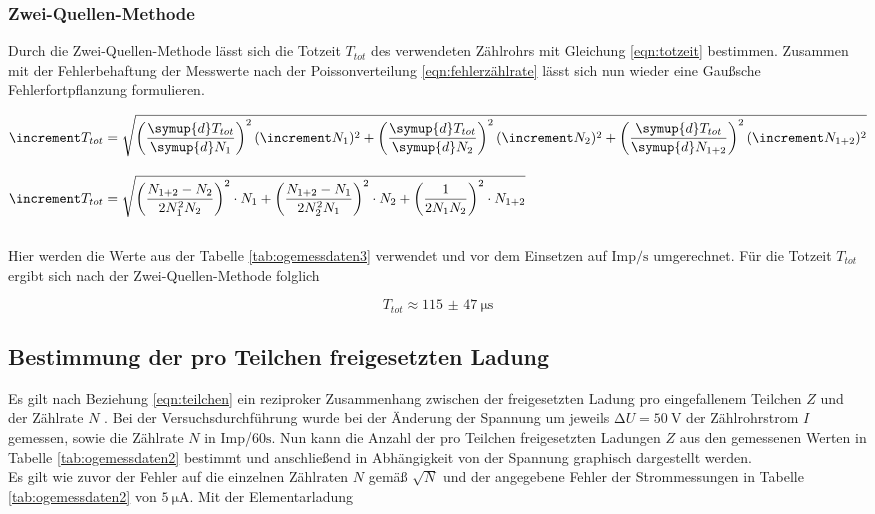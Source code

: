 \subsubsection{Zwei-Quellen-Methode}
Durch die Zwei-Quellen-Methode lässt sich die Totzeit $T_{tot}$ des verwendeten Zählrohrs mit Gleichung \eqref{eqn:totzeit} bestimmen.
Zusammen mit der Fehlerbehaftung der Messwerte nach der Poissonverteilung \eqref{eqn:fehlerzählrate} lässt sich nun wieder eine
Gaußsche Fehlerfortpflanzung formulieren.

\begin{align*}
\increment T_{tot} &= \sqrt{\left( \frac{\symup{d}T_{tot}}{\symup{d}N_{1}}\right)^{2} (\increment N_{1})^{2}
+\left( \frac{\symup{d}T_{tot}}{\symup{d}N_{2}}\right)^{2} (\increment N_{2})^{2}
+\left( \frac{\symup{d}T_{tot}}{\symup{d}N_{1+2}}\right)^{2} (\increment N_{1+2})^{2}
} \\[1em]
\increment T_{tot} &= \sqrt{\left( \frac{N_{1+2} - N_{2}}{2 N_{1}^{2} N_{2}}\right)^2 \cdot N_{1} 
+\left( \frac{N_{1+2} - N_{1}}{2 N_{2}^{2} N_{1}}\right)^2 \cdot N_{2}
+\left( \frac{1}{2 N_{1} N_{2}}\right)^2 \cdot N_{1+2}} 
\end{align*}
\\
Hier werden die Werte aus der Tabelle \ref{tab:ogemessdaten3} verwendet und vor dem Einsetzen auf $\text{Imp} / \si{\second}$ umgerechnet.
Für die Totzeit $T_{tot}$ ergibt sich nach der Zwei-Quellen-Methode folglich

\begin{equation}
T_{tot} \approx \SI{115(47)}{\micro\second}
\end{equation}

\subsection{Bestimmung der pro Teilchen freigesetzten Ladung}

Es gilt nach Beziehung \eqref{eqn:teilchen} ein reziproker Zusammenhang zwischen der freigesetzten Ladung pro eingefallenem Teilchen $Z$ und der
Zählrate $N$ . Bei der Versuchsdurchführung wurde bei der Änderung der Spannung um jeweils $\increment U = \SI{50}{\volt}$ der Zählrohrstrom $I$ gemessen, sowie die Zählrate
$N$ in $\text{Imp}$/$60\si{\second}$. Nun kann die Anzahl der pro Teilchen freigesetzten Ladungen $Z$ aus den gemessenen Werten in Tabelle \ref{tab:ogemessdaten2} bestimmt und anschließend
in Abhängigkeit von der Spannung graphisch dargestellt werden.
\newline
\\
Es gilt wie zuvor der Fehler auf die einzelnen Zählraten $N$ gemäß $\sqrt{N}$ und der angegebene Fehler der Strommessungen in Tabelle \ref{tab:ogemessdaten2} von $\SI{5}{\micro\ampere}$.
Mit der Elementarladung

